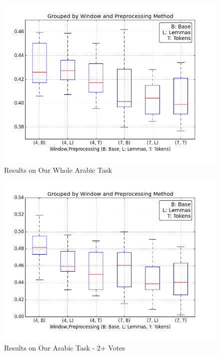 \begin{figure}
  \includegraphics[width=\linewidth]{results_spearman/ar_similiarity_task_results_spearplot.png}
  \caption{Results on Our Whole Arabic Task}
  \label{fig:spearplot1}
\end{figure}

\begin{figure}
  \includegraphics[width=\linewidth]{results_spearman/ar_similiarity_task_multi_results_spearplot.png}
  \caption{Results on Our Arabic Task - 2+ Votes}
  \label{fig:spearplot2}
\end{figure}

